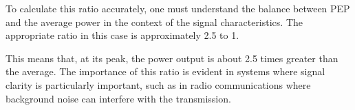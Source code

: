 To calculate this ratio accurately, one must understand the balance between PEP and the average power in the context of the signal characteristics. The appropriate ratio in this case is approximately 2.5 to 1. 

This means that, at its peak, the power output is about 2.5 times greater than the average. The importance of this ratio is evident in systems where signal clarity is particularly important, such as in radio communications where background noise can interfere with the transmission.

\begin{tikzpicture}
\end{tikzpicture}